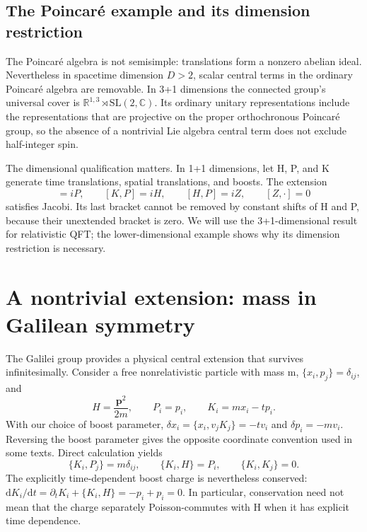 \documentclass[11pt]{article}
\newcommand{\dd}{\mathrm{d}}
\newcommand{\R}{\mathbb{R}}
\newcommand{\C}{\mathbb C}
\newcommand{\SL}{\mathrm{SL}}
\begin{document}
\subsection{The Poincar\'e example and its dimension restriction}
The Poincar\'e algebra is not semisimple: translations form a nonzero
abelian ideal. Nevertheless in spacetime dimension \(D>2\), scalar
central terms in the ordinary Poincar\'e algebra are removable. In
3+1 dimensions the connected group's universal cover is
\(\R^{1,3}\rtimes\SL(2,\C)\). Its ordinary unitary representations
include the representations that are projective on the proper
orthochronous Poincar\'e group, so the absence of a nontrivial Lie algebra
central term does not exclude half-integer spin.

The dimensional qualification matters. In 1+1 dimensions, let H, P, and
K generate time translations, spatial translations, and boosts. The
extension
\begin{equation}
 [K,H]=iP,\qquad [K,P]=iH,\qquad [H,P]=iZ,
 \qquad [Z,\cdot]=0
 \label{eq:poincare-two-dimensional}
\end{equation}
satisfies Jacobi. Its last bracket cannot be removed by constant shifts
of H and P, because their unextended bracket is zero. We will use the
3+1-dimensional result for relativistic QFT; the lower-dimensional
example shows why its dimension restriction is necessary.

\section{A nontrivial extension: mass in Galilean symmetry}
\label{sec:galilei}
The Galilei group provides a physical central extension that survives
infinitesimally. Consider a free nonrelativistic particle with mass m,
\(\{x_i,p_j\}=\delta_{ij}\), and
\begin{equation}
 H=\frac{\bm p^2}{2m},\qquad P_i=p_i,\qquad K_i=mx_i-tp_i.
 \label{eq:galilean-generators}
\end{equation}
With our choice of boost parameter,
\(\delta x_i=\{x_i,v_jK_j\}=-tv_i\) and
\(\delta p_i=-mv_i\). Reversing the boost parameter gives the opposite
coordinate convention used in some texts. Direct calculation yields
\begin{equation}
 \{K_i,P_j\}=m\delta_{ij},\qquad
 \{K_i,H\}=P_i,\qquad \{K_i,K_j\}=0.
 \label{eq:galilean-poisson}
\end{equation}
The explicitly time-dependent boost charge is nevertheless conserved:
\(\dd K_i/\dd t=\partial_tK_i+\{K_i,H\}=-p_i+p_i=0\).
In particular, conservation need not mean that the charge separately
Poisson-commutes with H when it has explicit time dependence.
\end{document}
